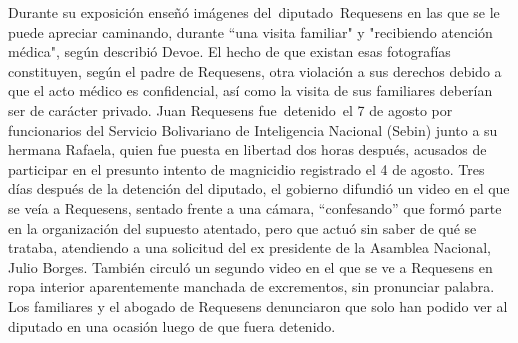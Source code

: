 \documentclass{article}%
\begin{document}
\newline%
%
Durante su exposición enseñó imágenes del~diputado~Requesens en las que se le puede apreciar caminando, durante “una visita familiar" y "recibiendo atención médica", según describió Devoe.%
\newline%
%
El hecho de que existan esas fotografías constituyen, según el padre de Requesens, otra violación a sus derechos debido a que el acto médico es confidencial, así como la visita de sus familiares deberían ser de carácter privado.%
\newline%
%
Juan Requesens fue~detenido~el 7 de agosto por funcionarios del Servicio Bolivariano de Inteligencia Nacional (Sebin) junto a su hermana Rafaela, quien fue puesta en libertad dos horas después, acusados de participar en el presunto intento de magnicidio registrado el 4 de agosto.%
\newline%
%
Tres días después de la detención del diputado, el gobierno difundió un video en el que se veía a Requesens, sentado frente a una cámara, “confesando” que formó parte en la organización del supuesto atentado, pero que actuó sin saber de qué se trataba, atendiendo a una solicitud del ex presidente de la Asamblea Nacional, Julio Borges.%
\newline%
%
También circuló un segundo video en el que se ve a Requesens en ropa interior aparentemente manchada de excrementos, sin pronunciar palabra.%
\newline%
%
Los familiares y el abogado de Requesens denunciaron que solo han podido ver al diputado en una ocasión luego de que fuera detenido.%
\newline%
%
\end{document}
